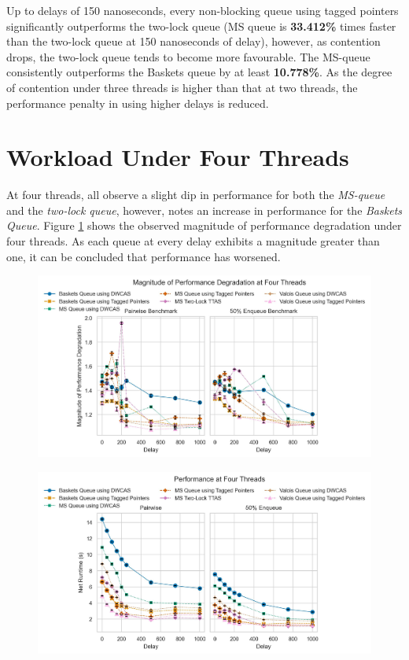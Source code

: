 Up to delays of 150 nanoseconds, every non-blocking queue using tagged
pointers significantly outperforms the two-lock queue (MS queue is
\textbf{33.412\%} times faster than the two-lock queue at 150 nanoseconds of
delay), however, as contention drops, the two-lock queue tends to become more
favourable. The MS-queue consistently outperforms the Baskets queue by at least
\textbf{10.778\%}. As the degree of contention under three threads is
higher than that at two threads, the performance penalty in using higher delays
is reduced.

\section{Workload Under Four Threads}
At four threads,
\citep{michael1996simple,hoffman2007baskets,ladan2008optimistic} all observe a
slight dip in performance for both the \emph{MS-queue} and the \emph{two-lock
queue}, however, \citeauthor{hoffman2007baskets} notes an increase in
performance for the \emph{Baskets Queue}. 
Figure \ref{fig:perf_deg_4_thread} shows the observed magnitude of performance
degradation under four threads. As each queue at every
delay exhibits a magnitude greater than one, it can be concluded that
performance has worsened.

\begin{figure}[!ht]
    \centering
    \includegraphics[width=1\textwidth]{images/plots/speedup_3.jpg}
    \caption{}
    \label{fig:perf_deg_4_thread}
\end{figure}

\begin{figure}[!ht]
    \centering
    \includegraphics[width=1\textwidth]{images/plots/delay_thread_4.jpg}
    \label{fig:perf_4_thread}
\end{figure}

